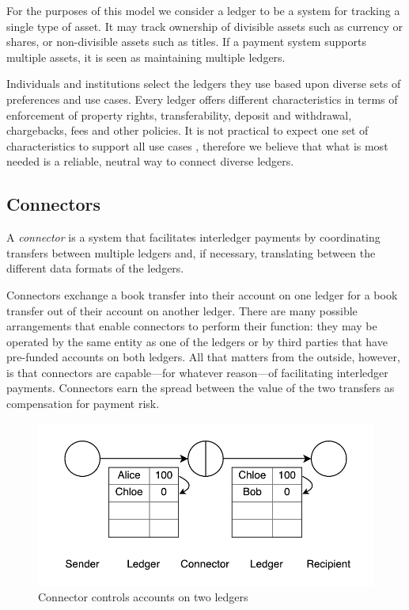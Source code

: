 \documentclass[letterpaper,twocolumn,10pt]{article}
\begin{document}
For the purposes of this model we consider a ledger to be a system for tracking a single type of asset. It may track ownership of divisible assets such as currency or shares, or non-divisible assets such as titles. If a payment system supports multiple assets, it is seen as maintaining multiple ledgers.

Individuals and institutions select the ledgers they use based upon diverse sets of preferences and use cases. Every ledger offers different characteristics in terms of enforcement of property rights, transferability, deposit and withdrawal, chargebacks, fees and other policies. It is not practical to expect one set of characteristics to support all use cases \cite{back2014enabling}, therefore we believe that what is most needed is a reliable, neutral way to connect diverse ledgers.

\subsection{Connectors}

A \textit{connector} is a system that facilitates interledger payments by coordinating transfers between multiple ledgers and, if necessary, translating between the different data formats of the ledgers. 

Connectors exchange a book transfer into their account on one ledger for a book transfer out of their account on another ledger. There are many possible arrangements that enable connectors to perform their function: they may be operated by the same entity as one of the ledgers or by third parties that have pre-funded accounts on both ledgers. All that matters from the outside, however, is that connectors are capable---for whatever reason---of facilitating interledger payments. Connectors earn the spread between the value of the two transfers as compensation for payment risk.

\begin{figure}[ht]
    \centering
    \includegraphics[width=\columnwidth]{figures/connector.pdf}
    \caption{Connector controls accounts on two ledgers}
    \label{fig:connector}
\end{figure}
\end{document}
